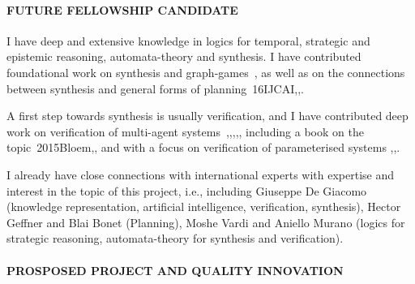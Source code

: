 \documentclass[a4paper,12pt,smallheadings]{scrartcl}
\begin{document}
\paragraph{FUTURE FELLOWSHIP CANDIDATE}


I have deep and extensive knowledge in logics for temporal, strategic and epistemic reasoning, automata-theory and synthesis. 
I have contributed foundational work on synthesis and graph-games~, as well as 
on the connections between synthesis and general forms of planning~\GMRS16IJCAI,\BDGRICAPS,. 

A first step towards synthesis is usually verification, and I have contributed deep work on verification of multi-agent systems~,,,,, including a book on the topic~\DBLPseriessynthesis2015Bloem,, and with a focus on verification of parameterised systems ,,.

I already have close connections with international experts with expertise and interest in the topic of this project, i.e., 
including Giuseppe De Giacomo (knowledge representation, artificial intelligence, verification, synthesis), Hector Geffner and Blai Bonet (Planning), Moshe Vardi and Aniello Murano (logics for strategic reasoning, automata-theory for synthesis and verification). 

\paragraph{PROSPOSED PROJECT AND QUALITY INNOVATION}
\end{document}
